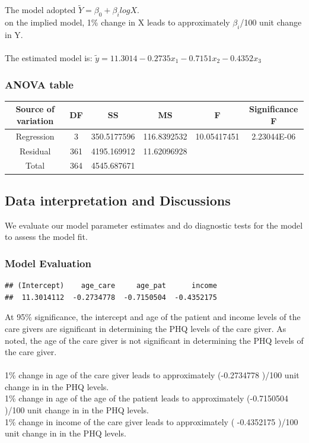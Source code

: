 \documentclass[11pt]{article}\usepackage[]{graphicx}\usepackage[]{xcolor}
\makeatletter
\newenvironment{kframe}{%
 \def\at@end@of@kframe{}%
 \ifinner\ifhmode%
  \def\at@end@of@kframe{\end{minipage}}%
  \begin{minipage}{\columnwidth}%
 \fi\fi%
 \def\FrameCommand##1{\hskip\@totalleftmargin \hskip-\fboxsep
 \colorbox{shadecolor}{##1}\hskip-\fboxsep
     \hskip-\linewidth \hskip-\@totalleftmargin \hskip\columnwidth}%
 \MakeFramed {\advance\hsize-\width
   \@totalleftmargin\z@ \linewidth\hsize
   \@setminipage}}%
 {\par\unskip\endMakeFramed%
 \at@end@of@kframe}
\newenvironment{knitrout}{}{} %
\numberwithin{equation}{section}
\numberwithin{table}{section}
\makeatother
\begin{document}
\noindent The model adopted  $\tilde{Y}=\beta_{0}+\beta_{i}log X$.\\
on the implied model, 1\% change in X leads to approximately $\beta_{i}$/100 unit change in Y.\\~\\

\noindent The estimated model is:
$\tilde{y}=11.3014-0.2735x_{1}-0.7151x_{2}-0.4352x_{3}$

\subsubsection{ANOVA table}
	\begin{tabular}{cccccc}
		\hline     
		Source of variation	& DF & SS &MS  &F  & Significance F \\
		\hline
		Regression	& 3 &350.5177596  & 116.8392532 &10.05417451	  &2.23044E-06  \\
		
		Residual	&	361  & 4195.169912	 &11.62096928	  &  &  \\
		
		Total	& 	364 & 4545.687671	 &  &  &  \\
		\hline
	\end{tabular}
	
\subsection{Data interpretation and Discussions}
We evaluate our model parameter estimates and do diagnostic tests for the model to assess the model fit.
\subsubsection{Model Evaluation}


\begin{knitrout}
\color{fgcolor}\begin{kframe}
\begin{verbatim}
## (Intercept)    age_care     age_pat      income 
##  11.3014112  -0.2734778  -0.7150504  -0.4352175
\end{verbatim}
\end{kframe}
\end{knitrout}
\noindent At 95\% significance, the intercept and age of the patient and income levels of the care givers are significant in determining the PHQ levels of the care giver. As noted, the age of the care giver is not significant in determining the PHQ levels of the care giver.\\~\\
1\% change in age of the care giver leads to approximately (-0.2734778 )/100 unit change in in the PHQ levels.\\
1\% change in age of the age of the patient leads to approximately (-0.7150504 )/100 unit change in in the PHQ levels.\\
1\% change in income  of the care giver leads to approximately ( -0.4352175 )/100 unit change in in the PHQ levels.\\~\\
\end{document}
